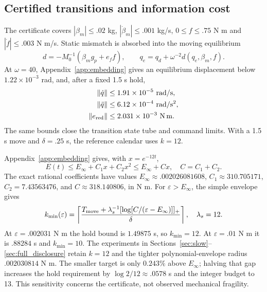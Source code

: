 \subsection{Certified transitions and information cost}
The certificate covers $|\beta_m|\le.02$ kg, $|\dot\beta_m|\le.001$ kg/s, $0\le f\le.75$ N m and $|\dot f|\le.003$ N m/s. Static mismatch is absorbed into the moving equilibrium
\begin{equation}
 d=-M_0^{-1}(\beta_mg_p+e_ff),\qquad
 q_e=q_d+\omega^{-2}d(q_e,\beta_m,f).
\end{equation}
At $\omega=40$, Appendix~\ref{app:embedding} gives an equilibrium displacement below $1.22\times10^{-3}$ rad, and, after a fixed 1.5 s hold,
\begin{align}
 \|\dot q\|&\le1.91\times10^{-5}\ \mathrm{rad/s},\nonumber\\
 \|\ddot q\|&\le6.12\times10^{-4}\ \mathrm{rad/s^2},\nonumber\\
 \|e_{\rm red}\|&\le2.031\times10^{-3}\ \mathrm{N\,m}.
 \label{eq:extended_hold}
\end{align}
The same bounds close the transition state tube and command limits. With a 1.5 s move and $\delta=.25$ s, the reference calendar uses $k=12$.

Appendix~\ref{app:embedding} gives, with $x=e^{-12t}$,
\begin{equation}
 E(t)\le E_\infty+C_1x+C_2x^2\le E_\infty+Cx,
 \quad C=C_1+C_2.\label{eq:admission_constants}
\end{equation}
The exact rational coefficients have values $E_\infty\approx.002026081608$, $C_1\approx310.705171$, $C_2=7.43563476$, and $C\approx318.140806$, in N m.
For $\varepsilon>E_\infty$, the simple envelope gives
\begin{equation}
 k_{\min}(\varepsilon)=\left\lceil\frac{T_{\rm move}
 +\lambda_s^{-1}[\log[C/(\varepsilon-E_\infty)]]_+}{\delta}\right\rceil,
 \quad\lambda_s=12.\label{eq:k_control}
\end{equation}
At $\varepsilon=.002031$ N m the hold bound is $1.49875$ s, so $k_{\min}=12$. At $\varepsilon=.01$ N m it is $.88284$ s and $k_{\min}=10$. The experiments in Sections~\ref{sec:slow}--\ref{sec:full_disclosure} retain $k=12$ and the tighter polynomial-envelope radius $.002030814$ N m. The smaller target is only $0.243\%$ above $E_\infty$; halving that gap increases the hold requirement by $\log2/12\approx.0578$ s and the integer budget to 13. This sensitivity concerns the certificate, not observed mechanical fragility.

